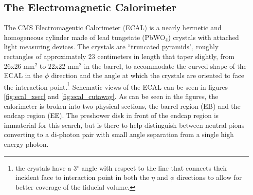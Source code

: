   \subsection{The Electromagnetic Calorimeter} \label{sec:ECAL}
    The CMS Electromagentic Calorimeter (ECAL) is a nearly hermetic and homogeneous cylinder made of lead tungstate (PbWO$_4$) crystals with attached light measuring devices. The crystals are ``truncated pyramids", roughly rectangles of approximately 23 centimeters in length that taper slightly, from 26x26 mm$^2$ to 22x22 mm$^2$ in the barrel\cite[pg. 4]{ecal_energy_reco}, to accommodate the curved shape of the ECAL in the $\phi$ direction and the angle at which the crystals are oriented to face the interaction point.\footnote{the crystals have a 3$^\circ$ angle with respect to the line that connects their incident face to interaction point in both the $\eta$ and $\phi$ directions to allow for better coverage of the fiducial volume.} Schematic views of the ECAL can be seen in figures \ref{fig:ecal_xsec} and \ref{fig:ecal_cutaway}. As can be seen in the figures, the calorimeter is broken into two physical sections, the barrel region (EB) and the endcap region (EE). The preshower disk in front of the endcap region is immaterial for this search, but is there to help distinguish between neutral pions converting to a di-photon pair with small angle separation from a single high energy photon. 

